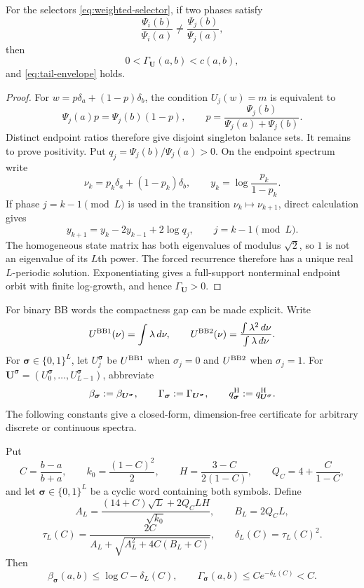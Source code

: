 \documentclass[letterpaper,twoside]{article}
\begin{document}
\begin{corollary}\label{cor:weighted-gap}
For the selectors \eqref{eq:weighted-selector}, if two phases satisfy
\[
 \frac{\Psi_i(b)}{\Psi_i(a)}
 \ne\frac{\Psi_j(b)}{\Psi_j(a)},
\]
then
\[
 0<\Gamma_{\bm U}(a,b)<c(a,b),
\]
and \eqref{eq:tail-envelope} holds.
\end{corollary}

\begin{proof}
For $w=p\delta_a+(1-p)\delta_b$, the condition $U_j(w)=m$ is equivalent to
\[
 \Psi_j(a)p=\Psi_j(b)(1-p),
 \qquad
 p=\frac{\Psi_j(b)}{\Psi_j(a)+\Psi_j(b)}.
\]
Distinct endpoint ratios therefore give disjoint singleton balance sets.
It remains to prove positivity.  Put $q_j=\Psi_j(b)/\Psi_j(a)>0$.  On the
endpoint spectrum write
\[
 \nu_k=p_k\delta_a+(1-p_k)\delta_b,
 \qquad
 y_k=\log\frac{p_k}{1-p_k}.
\]
If phase $j=k-1\pmod L$ is used in the transition
$\nu_k\mapsto\nu_{k+1}$, direct calculation gives
\[
 y_{k+1}=y_k-2y_{k-1}+2\log q_j,
 \qquad j=k-1\pmod L.
\]
The homogeneous state matrix has both eigenvalues of modulus $\sqrt2$, so
$1$ is not an eigenvalue of its $L$th power.  The forced recurrence therefore
has a unique real $L$-periodic solution.  Exponentiating gives a full-support
nonterminal endpoint orbit with finite log-growth, and hence
$\Gamma_{\bm U}>0$.
\end{proof}

For binary BB words the compactness gap can be made explicit.  Write
\[
 U^{\rm BB1}(\nu)=\int\lambda\,d\nu,
 \qquad
 U^{\rm BB2}(\nu)=
 \frac{\int\lambda^2\,d\nu}{\int\lambda\,d\nu}.
\]
For $\bm\sigma\in\{0,1\}^L$, let $U_j^{\bm\sigma}$ be $U^{\rm BB1}$
when $\sigma_j=0$ and $U^{\rm BB2}$ when $\sigma_j=1$.  For
$\bm U^{\bm\sigma}=(U_0^{\bm\sigma},\ldots,U_{L-1}^{\bm\sigma})$, abbreviate
\[
 \beta_{\bm\sigma}:=\beta_{\bm U^{\bm\sigma}},\qquad
 \Gamma_{\bm\sigma}:=\Gamma_{\bm U^{\bm\sigma}},\qquad
 q^{\rm H}_{\bm\sigma}:=q^{\rm H}_{\bm U^{\bm\sigma}}.
\]
The following constants give a closed-form, dimension-free certificate for
arbitrary discrete or continuous spectra.

\begin{theorem}
\label{thm:explicit-mixed-gap}
Put
\[
 C=\frac{b-a}{b+a},\qquad
 k_0=\frac{(1-C)^2}{2},\qquad
 H=\frac{3-C}{2(1-C)},\qquad
 Q_C=4+\frac{C}{1-C},
\]
and let $\bm\sigma\in\{0,1\}^L$ be a cyclic word containing both symbols.
Define
\[
 A_L=\frac{(14+C)\sqrt L+2Q_CLH}{\sqrt{k_0}},
 \qquad B_L=2Q_CL,
\]
\begin{equation}\label{eq:explicit-gap-constant}
 \tau_L(C)=
 \frac{2C}{A_L+\sqrt{A_L^2+4C(B_L+C)}},
 \qquad \delta_L(C)=\tau_L(C)^2.
\end{equation}
Then
\begin{equation}\label{eq:explicit-mixed-gap}
 \beta_{\bm\sigma}(a,b)
 \le\log C-\delta_L(C),
 \qquad
 \Gamma_{\bm\sigma}(a,b)
 \le Ce^{-\delta_L(C)}<C.
\end{equation}
\end{theorem}
\end{document}
